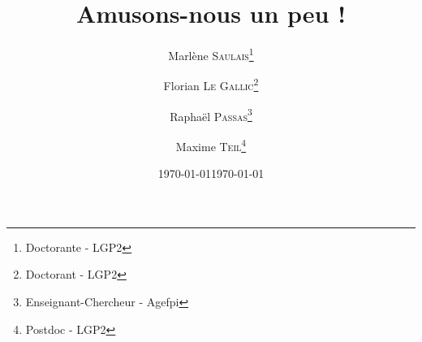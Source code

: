 \documentclass[a4paper, 11pt]{report} %
\date{\today}
\title{Amusons-nous un peu !}
\author{Marlène \textsc{Saulais}\thanks{Doctorante - LGP2}
		\and Florian \textsc{Le Gallic}\thanks{Doctorant - LGP2}
		\and Rapha\"el \textsc{Passas}\thanks{Enseignant-Chercheur - Agefpi}
		\and Maxime \textsc{Teil}\thanks{Postdoc - LGP2}}
\date{\today}
\begin{document}
	
	\maketitle
	
	\blinddocument
	
	
\end{document}
